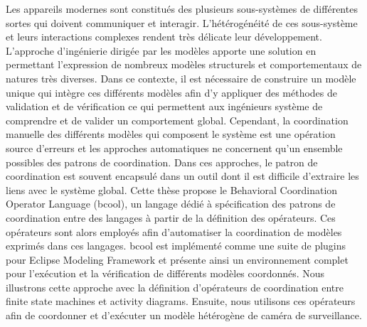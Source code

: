 
\begin{frenchabstract}
Les appareils modernes sont constitués des plusieurs sous-systèmes de différentes sortes qui doivent communiquer et interagir. L'hétérogénéité de ces sous-système et leurs interactions complexes rendent très délicate leur développement. L'approche d'ingénierie dirigée par les modèles apporte une solution en permettant l'expression de nombreux modèles structurels et comportementaux de natures très diverses. Dans ce contexte, il est nécessaire de construire un modèle unique qui intègre ces différents modèles afin d'y appliquer des méthodes de validation et de vérification ce qui permettent aux ingénieurs système de comprendre et de valider un comportement global. Cependant, la coordination manuelle des différents modèles qui composent le système est une opération source d'erreurs et les approches automatiques ne concernent qu'un ensemble possibles des patrons de coordination. Dans ces approches, le patron de coordination est souvent encapsulé dans un outil dont il est difficile d'extraire les liens avec le système global. Cette thèse propose le Behavioral Coordination Operator Language (bcool), un langage dédié à spécification des patrons de coordination entre des langages à partir de la définition des opérateurs. Ces opérateurs sont alors employés afin d'automatiser la coordination de modèles exprimés dans ces langages. bcool est implémenté comme une suite de plugins pour Eclipse Modeling Framework et présente ainsi un environnement complet pour l'exécution et la vérification de différents modèles coordonnés. Nous illustrons cette approche avec la définition d'opérateurs de coordination entre finite state machines et activity diagrams. Ensuite, nous utilisons ces opérateurs afin de coordonner et d'exécuter un modèle hétérogène de caméra de surveillance.
\end{frenchabstract}



\cleardoublepage
{}


